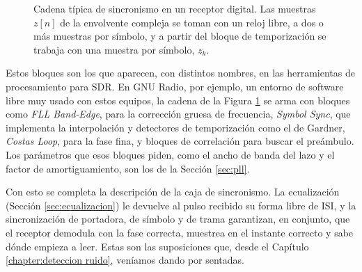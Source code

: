 \begin{figure}
    \begin{center}
    \end{center}
    \caption{Cadena típica de sincronismo en un receptor digital. Las muestras $z[n]$ de la envolvente compleja se toman con un reloj libre, a dos o más muestras por símbolo, y a partir del bloque de temporización se trabaja con una muestra por símbolo, $z_k$.}\label{fig:cadena sdr}
\end{figure}

Estos bloques son los que aparecen, con distintos nombres, en las herramientas de procesamiento para SDR. En GNU Radio, por ejemplo, un entorno de software libre muy usado con estos equipos, la cadena de la Figura \ref{fig:cadena sdr} se arma con bloques como \emph{FLL Band-Edge}, para la corrección gruesa de frecuencia, \emph{Symbol Sync}, que implementa la interpolación y detectores de temporización como el de Gardner, \emph{Costas Loop}, para la fase fina, y bloques de correlación para buscar el preámbulo. Los parámetros que esos bloques piden, como el ancho de banda del lazo y el factor de amortiguamiento, son los de la Sección \ref{sec:pll}.

Con esto se completa la descripción de la caja de sincronismo. La ecualización (Sección \ref{sec:ecualizacion}) le devuelve al pulso recibido su forma libre de ISI, y la sincronización de portadora, de símbolo y de trama garantizan, en conjunto, que el receptor demodula con la fase correcta, muestrea en el instante correcto y sabe dónde empieza a leer. Estas son las suposiciones que, desde el Capítulo \ref{chapter:deteccion ruido}, veníamos dando por sentadas.

